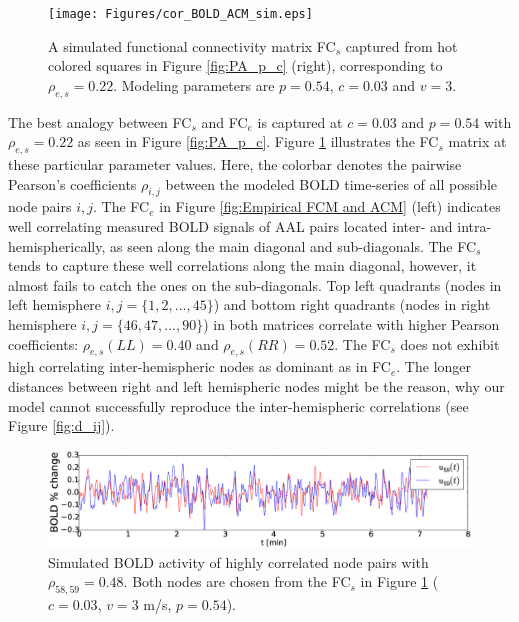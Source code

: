 \documentclass[fleqn,10pt]{wlpeerj}
\begin{document}
\begin{figure}[htpb]\centering
	 \texttt{[image: Figures/cor\_BOLD\_ACM\_sim.eps]} 

  \caption{A simulated functional connectivity matrix FC$_s$ captured from hot colored squares in Figure \ref{fig:PA_p_c} (right), corresponding to $\rho_{e,s} = 0.22$. Modeling parameters are $p=0.54$, $c=0.03$ and $v=3$. } 
    \label{fig:BOLD_e_s}
 	
\end{figure}  


The best analogy between FC$_s$ and FC$_e$ is captured at $c=0.03$ and $p=0.54$ with $\rho_{e,s}=0.22$ as seen in Figure \ref{fig:PA_p_c}. Figure \ref{fig:BOLD_e_s} illustrates the FC$_s$ matrix at these particular parameter values. Here, the colorbar denotes the pairwise Pearson's coefficients $\rho_{i,j}$ between the modeled BOLD time-series of all possible node pairs ${i,j}$. The FC$_e$ in Figure \ref{fig:Empirical FCM and ACM} (left) indicates 
well correlating measured BOLD signals of AAL pairs located inter- and intra-hemispherically, as seen  along the main diagonal and sub-diagonals. The FC$_s$ tends to capture these well correlations along the main diagonal, however, it almost fails to catch the ones on the sub-diagonals. Top left quadrants (nodes in left hemisphere $i,j=\{1,2,...,45\}$) and bottom right quadrants (nodes in right hemisphere $i,j=\{46,47,...,90\}$) in both matrices correlate with higher Pearson coefficients: $\rho_{e,s}(LL)=0.40$ and $\rho_{e,s}(RR)=0.52$. The FC$_s$ does not exhibit high correlating inter-hemispheric nodes as dominant as in FC$_e$. The longer distances between right and left hemispheric nodes might be the reason, why our model cannot successfully reproduce the inter-hemispheric correlations (see Figure \ref{fig:d_ij}). 
    

\begin{figure}[htpb] \centering
	 \includegraphics[width=\textwidth]{Figures/cor_BOLD_ACM_sim_no_best.eps} 
 
  \caption{Simulated BOLD activity of highly correlated node pairs with $\rho_{58,59}=0.48$. Both nodes are chosen from the FC$_s$ in Figure \ref{fig:BOLD_e_s} ($c=0.03$, $v=3$ m/s, $p=0.54$).} 
    \label{fig:BOLD_nodes}
\end{figure} 
\end{document}
